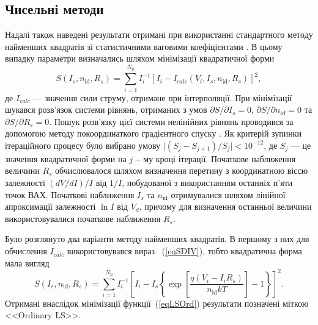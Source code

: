 \subsection{Чисельні методи}
Надалі також наведені результати отримані при використанні стандартного методу найменших квадратів зі статистичними ваговими коефіцієнтами \cite[с.~67]{KalitkinBook}.
В цьому випадку параметри визначались шляхом мінімізації квадратичної форми
\begin{equation}
\label{eqLS}
S(I_s,n_\mathrm{id},R_s)=\sum_{i=1}^{N_p}I_i^{-1}\left[I_i-I_{calc}(V_i,I_s,n_\mathrm{id},R_s)\right]^2,
\end{equation}
де $I_{calc}$ --- значення сили струму, отримане при інтерполяції.
При мінімізації шукався розв'язок системи рівнянь, отриманих з умов $\partial S/\partial I_s=0$,
$\partial S/\partial n_\mathrm{id}=0$ та $\partial S/\partial R_s=0$.
Пошук розв'язку цієї системи нелінійних рівнянь проводився за допомогою методу покоординаткого градієнтного спуску \cite[с.~231]{KalitkinBook}.
Як критерій зупинки ітераційного процесу було вибрано умову $\mid(S_j-S_{j+1})/S_j\mid<10^{-12}$,
де $S_j$ --- це значення квадратичної форми на $j-$му кроці ітерації.
Початкове наближення величини $R_s$ обчислювалося шляхом визначення перетину з координатною віссю залежності $(dV/dI)/I$ від $1/I$,
побудованої з використанням останніх п'яти точок ВАХ.
Початкові наближення $I_s$ та $n_\mathrm{id}$ отримувалися шляхом лінійної апроксимації залежності $\ln I$ від $V_d$, причому для визначення останньої величини використовувалися початкове наближення  $R_s$.

Було розглянуто два варіанти методу найменших квадратів.
В першому з них для обчислення $I_{calc}$ використовувався вираз ~(\ref{eqSDIV}), тобто квадратична форма мала вигляд
\begin{equation}
\label{eqLSOrd}
S(I_s,n_\mathrm{id},R_s)=\sum_{i=1}^{N_p}I_i^{-1}\left[I_i-I_s\left\{\exp\left[\frac{q(V_i-I_iR_s)}{n_\mathrm{id}kT}\right]-1\right\}\right]^2.
\end{equation}
Отримані внаслідок мінімізації функції~(\ref{eqLSOrd}) результати позначені міткою <<Ordinary LS>>.


